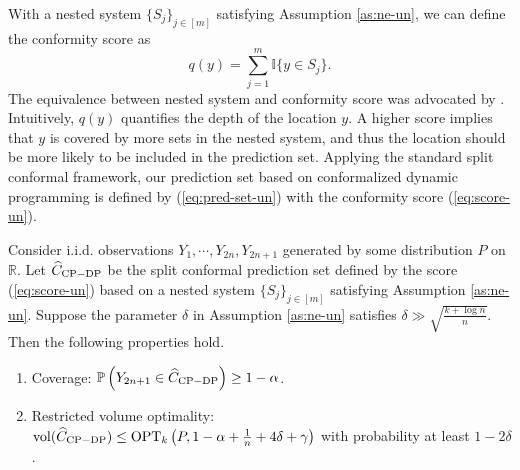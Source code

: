 With a nested system $\{S_j\}_{j\in[m]}$ satisfying Assumption \ref{as:ne-un}, we can define the conformity score as
\begin{equation}
q(y) = \sum_{j=1}^m\mathbb{I}\{y\in S_j\}. \label{eq:score-un}
\end{equation}
The equivalence between nested system and conformity score was advocated by \cite{gupta2022nested}.
Intuitively, $q(y)$ quantifies the depth of the location $y$. A higher score implies that $y$ is covered by more sets in the nested system, and thus the location should be more likely to be included in the prediction set. Applying the standard split conformal framework, our prediction set based on conformalized dynamic programming is defined by (\ref{eq:pred-set-un}) with the conformity score (\ref{eq:score-un}).

\begin{theorem}\label{thm:unsupervised}
Consider i.i.d. observations $Y_1,\cdots,Y_{2n},Y_{2n+1}$ generated by some distribution $P$ on $\mathbb{R}$. Let $\widehat{C}_{\rm CP-DP}$ be the split conformal prediction set defined by the score (\ref{eq:score-un}) based on a nested system $\{S_j\}_{j\in[m]}$ satisfying Assumption \ref{as:ne-un}. Suppose the parameter $\delta$ in Assumption \ref{as:ne-un} satisfies $\delta\gg \sqrt{\frac{k+\log n}{n}}$. Then the following properties hold.
\begin{enumerate}
\item Coverage: $\mathbb{P}\left(Y_{2n+1}\in\widehat{C}_{\rm CP-DP}\right)\geq 1-\alpha$.
\item Restricted volume optimality: \\$\mathrm{vol}(\widehat{C}_{\rm CP-DP})\leq \operatorname{OPT}_k\left(P,1-\alpha+\frac{1}{n}+4\delta+\gamma\right)$ with probability at least $1-2\delta$.
\end{enumerate}
\end{theorem}

